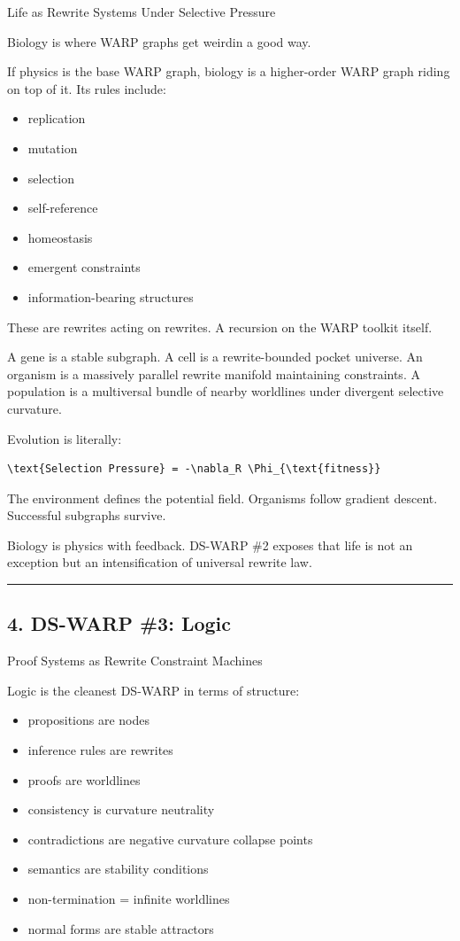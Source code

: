 Life as Rewrite Systems Under Selective Pressure

Biology is where WARP graphs get weird\emd{}in a good way.

If physics is the base WARP graph, biology is a higher-order WARP graph riding on top
of it. Its rules include:

\begin{itemize}
\tightlist
\item
  replication
\item
  mutation
\item
  selection
\item
  self-reference
\item
  homeostasis
\item
  emergent constraints
\item
  information-bearing structures
\end{itemize}

These are rewrites acting on rewrites. A recursion on the WARP toolkit
itself.

A gene is a stable subgraph. A cell is a rewrite-bounded pocket
universe. An organism is a massively parallel rewrite manifold
maintaining constraints. A population is a multiversal bundle of nearby
worldlines under divergent selective curvature.

Evolution is literally:

\begin{lstlisting}
\text{Selection Pressure} = -\nabla_R \Phi_{\text{fitness}}
\end{lstlisting}

The environment defines the potential field. Organisms follow gradient
descent. Successful subgraphs survive.

Biology is physics with feedback. DS-WARP \#2 exposes that life is not an
exception but an intensification of universal rewrite law.

\begin{center}\rule{0.5\linewidth}{0.5pt}\end{center}

\subsection{4. DS-WARP \#3: Logic}\label{ds-rmg-3-logic}

Proof Systems as Rewrite Constraint Machines

Logic is the cleanest DS-WARP in terms of structure:

\begin{itemize}
\tightlist
\item
  propositions are nodes
\item
  inference rules are rewrites
\item
  proofs are worldlines
\item
  consistency is curvature neutrality
\item
  contradictions are negative curvature collapse points
\item
  semantics are stability conditions
\item
  non-termination = infinite worldlines
\item
  normal forms are stable attractors
\end{itemize}

